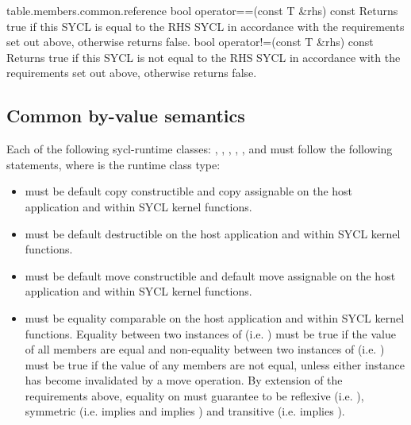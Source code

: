 {table.members.common.reference}
   \addRow
   {bool operator==(const T \&rhs) const}
   {
     Returns true if this SYCL  is equal to the RHS SYCL  in accordance with the requirements set out above, otherwise returns false.
   }
   \addRow
   {bool operator!=(const T \&rhs) const}
   {
     Returns true if this SYCL  is not equal to the RHS SYCL  in accordance with the requirements set out above, otherwise returns false.
   }
\completeTable

\subsection{Common by-value semantics}
\label{sec:byval-semantics}

Each of the following \gls{sycl-runtime} classes: , , , , ,  and  must follow the following statements, where  is the runtime class type:

\begin{itemize}

\item {} must be default copy constructible and copy assignable on the host application and within SYCL kernel functions.

\item {} must be default destructible on the host application and within SYCL kernel functions.

\item {} must be default move constructible and default move assignable on the host application and within SYCL kernel functions.

\item {} must be equality comparable on the host application and within SYCL kernel functions. Equality between two instances of  (i.e. ) must be true if the value of all members are equal and non-equality between two instances of  (i.e. ) must be true if the value of any members are not equal, unless either instance has become invalidated by a move operation. By extension of the requirements above, equality on  must guarantee to be reflexive (i.e. ), symmetric (i.e.  implies  and  implies ) and transitive (i.e.  implies ).

\end{itemize}


